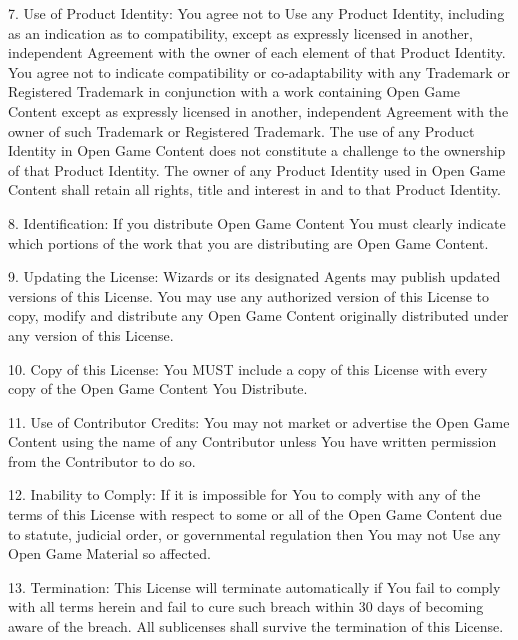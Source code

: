 \documentclass[11pt]{article}
\begin{document}
7. Use of Product Identity: You agree not to Use any Product Identity, including as an indication as to compatibility, except as expressly licensed in another, independent Agreement with the owner of each element of that Product Identity. You agree not to indicate compatibility or co-adaptability with any Trademark or Registered Trademark in conjunction with a work containing Open Game Content except as expressly licensed in another, independent Agreement with the owner of such Trademark or Registered Trademark. The use of any Product Identity in Open Game Content does not constitute a challenge to the ownership of that Product Identity. The owner of any Product Identity used in Open Game Content shall retain all rights, title and interest in and to that Product Identity.

\bigskip

8. Identification: If you distribute Open Game Content You must clearly indicate which portions of the work that you are distributing are Open Game Content.

\bigskip

9. Updating the License: Wizards or its designated Agents may publish updated versions of this License. You may use any authorized version of this License to copy, modify and distribute any Open Game Content originally distributed under any version of this License.

\bigskip

10. Copy of this License: You MUST include a copy of this License with every copy of the Open Game Content You Distribute.

\bigskip

11. Use of Contributor Credits: You may not market or advertise the Open Game Content using the name of any Contributor unless You have written permission from the Contributor to do so.

\bigskip

12. Inability to Comply: If it is impossible for You to comply with any of the terms of this License with respect to some or all of the Open Game Content due to statute, judicial order, or governmental regulation then You may not Use any Open Game Material so affected.

\bigskip

13. Termination: This License will terminate automatically if You fail to comply with all terms herein and fail to cure such breach within 30 days of becoming aware of the breach. All sublicenses shall survive the termination of this License.
\end{document}
